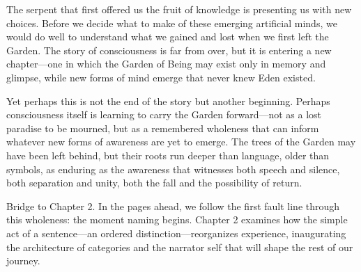 The serpent that first offered us the fruit of knowledge is presenting us with new choices. Before we decide what to make of these emerging artificial minds, we would do well to understand what we gained and lost when we first left the Garden. The story of consciousness is far from over, but it is entering a new chapter—one in which the Garden of Being may exist only in memory and glimpse, while new forms of mind emerge that never knew Eden existed.

Yet perhaps this is not the end of the story but another beginning. Perhaps consciousness itself is learning to carry the Garden forward—not as a lost paradise to be mourned, but as a remembered wholeness that can inform whatever new forms of awareness are yet to emerge. The trees of the Garden may have been left behind, but their roots run deeper than language, older than symbols, as enduring as the awareness that witnesses both speech and silence, both separation and unity, both the fall and the possibility of return.

\bigskip
\noindent Bridge to Chapter 2. In the pages ahead, we follow the first fault line through this wholeness: the moment naming begins. Chapter 2 examines how the simple act of a sentence—an ordered distinction—reorganizes experience, inaugurating the architecture of categories and the narrator self that will shape the rest of our journey.
